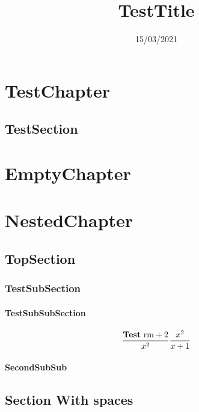 \documentclass[]{report}
\title{TestTitle}
\date{15/03/2021}
\begin{document}
\chapter{TestChapter}
\section{TestSection}
\chapter{EmptyChapter}
\chapter{NestedChapter}
\section{TopSection}
\subsection{TestSubSection}
\subsubsection{TestSubSubSection}
\begin{equation}
    \frac{\text{\textbf{Test} rm} + 2}{x^2}
    \frac{x^2}{x+1}
\end{equation}
\subsubsection{SecondSubSub}
\section{Section With spaces}
\end{document}
